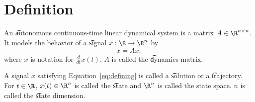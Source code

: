 
\section*{Definition}

An \t{autonomous continuous-time linear dynamical system} is a matrix $A \in \R ^{n \times n}$.
It models the behavior of a \t{signal} $x: \R  \to \R ^n$ by
\begin{equation}
  \label{eq:defining}\dot{x} = Ax,\end{equation}
where $\dot{x}$ is notation for $\frac{d}{dt} x(t)$.
$A$ is called the \t{dynamics matrix}.

A signal $x$ satisfying Equation~\eqref{eq:defining} is called a \t{solution} or a \t{trajectory}.
For $t \in \R $, $x(t) \in \R ^n$ is called the \t{state} and $\R ^n$ is called the state space.
$n$ is called the \t{state dimension}.

\blankpage